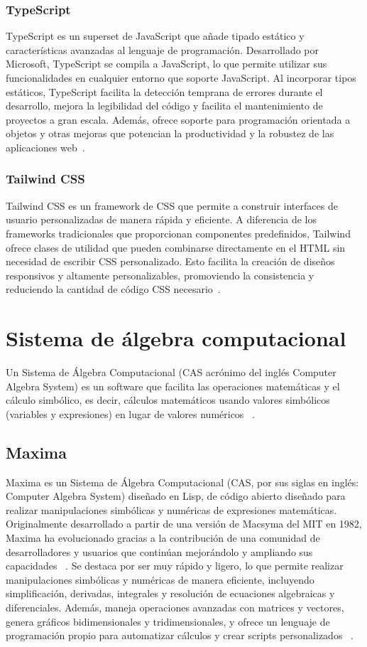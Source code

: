 \subsubsection{TypeScript}
TypeScript es un superset de JavaScript que añade tipado estático y características avanzadas al lenguaje de programación. Desarrollado por Microsoft, TypeScript se compila a JavaScript, lo que permite utilizar sus funcionalidades en cualquier entorno que soporte JavaScript. Al incorporar tipos estáticos, TypeScript facilita la detección temprana de errores durante el desarrollo, mejora la legibilidad del código y facilita el mantenimiento de proyectos a gran escala. Además, ofrece soporte para programación orientada a objetos y otras mejoras que potencian la productividad y la robustez de las aplicaciones web~\cite{TypescriptDOCS}.


\subsubsection{Tailwind CSS}
Tailwind CSS es un framework de CSS  que permite a construir interfaces de usuario personalizadas de manera rápida y eficiente. A diferencia de los frameworks tradicionales que proporcionan componentes predefinidos, Tailwind ofrece clases de utilidad que pueden combinarse directamente en el HTML sin necesidad de escribir CSS personalizado. Esto facilita la creación de diseños responsivos y altamente personalizables, promoviendo la consistencia y reduciendo la cantidad de código CSS necesario~\cite{TailwindCSS}.

\section{Sistema de álgebra computacional}
Un Sistema de Álgebra Computacional (CAS acrónimo del inglés Computer Algebra System) es un software que facilita las operaciones matemáticas y el cálculo simbólico, es decir, cálculos matemáticos usando valores simbólicos (variables y expresiones) en lugar de valores numéricos ~\cite{MaximaSourgeforce}.

\subsection{Maxima}
Maxima es un Sistema de Álgebra Computacional (CAS, por sus siglas en inglés: Computer Algebra System) diseñado en Lisp, de código abierto diseñado para realizar manipulaciones simbólicas y numéricas de expresiones matemáticas. Originalmente desarrollado a partir de una versión de Macsyma del MIT en 1982, Maxima ha evolucionado gracias a la contribución de una comunidad de desarrolladores y usuarios que continúan mejorándolo y ampliando sus capacidades ~\cite{MaximaSourgeforce}.  \newline
Se destaca por ser muy rápido y ligero, lo que permite realizar manipulaciones simbólicas y numéricas de manera eficiente, incluyendo simplificación, derivadas, integrales y resolución de ecuaciones algebraicas y diferenciales. Además, maneja operaciones avanzadas con matrices y vectores, genera gráficos bidimensionales y tridimensionales, y ofrece un lenguaje de programación propio para automatizar cálculos y crear scripts personalizados ~\cite{MaximaSourgeforce}. 

